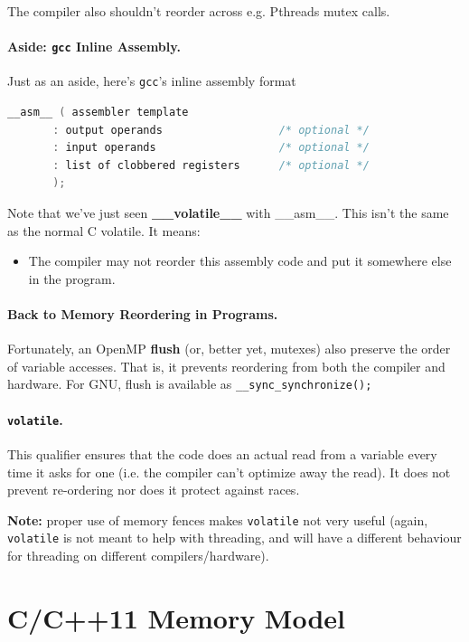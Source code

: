 \documentclass[a4paper]{report}
\begin{document}
The compiler also shouldn't reorder across e.g. Pthreads mutex calls.

\paragraph{Aside: {\tt gcc} Inline Assembly.}
Just as an aside, here's {\tt gcc}'s inline assembly format

  \begin{lstlisting}[language=C]
__asm__ ( assembler template 
       : output operands                  /* optional */
       : input operands                   /* optional */
       : list of clobbered registers      /* optional */
       );
  \end{lstlisting}

Note that we've just seen {\bf \_\_volatile\_\_} with  \_\_asm\_\_. This isn't the same as the normal C volatile. It means:
\begin{itemize}
    \item The compiler may not reorder this assembly code and put it somewhere
      else in the program.
\end{itemize}

\paragraph{Back to Memory Reordering in Programs.}
    Fortunately, an OpenMP {\bf flush} (or, better yet, mutexes) also preserve the order of variable accesses.
    That is, it prevents reordering from both the compiler and hardware.
    For GNU, flush is available as
      {\tt \_\_sync\_synchronize();}

\paragraph{{\tt volatile}.} This qualifier ensures that the
code does an actual read from a variable every time it asks for one
(i.e. the compiler can't optimize away the read). It does not prevent
re-ordering nor does it protect against races.

{\bf Note:} proper use of memory fences makes {\tt volatile} not very
useful (again, {\tt volatile} is not meant to help with threading, and
will have a different behaviour for threading on different
compilers/hardware).


\section*{C/C++11 Memory Model}
\end{document}
